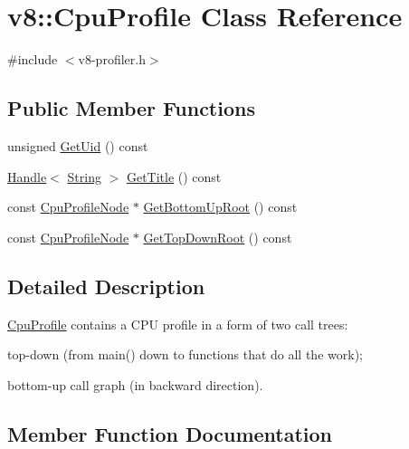 \hypertarget{classv8_1_1_cpu_profile}{}\section{v8\+:\+:Cpu\+Profile Class Reference}
\label{classv8_1_1_cpu_profile}


{\ttfamily \#include $<$v8-\/profiler.\+h$>$}

\subsection*{Public Member Functions}
\begin{DoxyCompactItemize}
\item 
unsigned \hyperlink{classv8_1_1_cpu_profile_a382bbf10d24a2cd8b17acb8508c56a58}{Get\+Uid} () const 
\item 
\hyperlink{classv8_1_1_handle}{Handle}$<$ \hyperlink{classv8_1_1_string}{String} $>$ \hyperlink{classv8_1_1_cpu_profile_afbb44d5cf0a8729c9074aba03207e5cc}{Get\+Title} () const 
\item 
const \hyperlink{classv8_1_1_cpu_profile_node}{Cpu\+Profile\+Node} $\ast$ \hyperlink{classv8_1_1_cpu_profile_ac056d92eaf995873d827d4697a334c6a}{Get\+Bottom\+Up\+Root} () const 
\item 
const \hyperlink{classv8_1_1_cpu_profile_node}{Cpu\+Profile\+Node} $\ast$ \hyperlink{classv8_1_1_cpu_profile_aec978f073af6634b6495baa65209a31f}{Get\+Top\+Down\+Root} () const 
\end{DoxyCompactItemize}


\subsection{Detailed Description}
\hyperlink{classv8_1_1_cpu_profile}{Cpu\+Profile} contains a C\+P\+U profile in a form of two call trees\+:
\begin{DoxyItemize}
\item top-\/down (from main() down to functions that do all the work);
\item bottom-\/up call graph (in backward direction). 
\end{DoxyItemize}

\subsection{Member Function Documentation}
\hypertarget{classv8_1_1_cpu_profile_ac056d92eaf995873d827d4697a334c6a}{}
